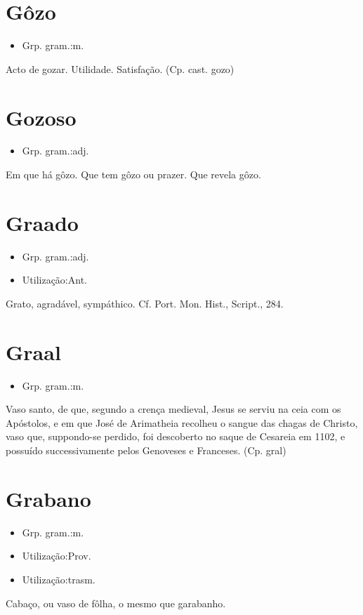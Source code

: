 \section{Gôzo}
\begin{itemize}
\item {Grp. gram.:m.}
\end{itemize}
Acto de gozar.
Utilidade.
Satisfação.
(Cp. cast. \textunderscore gozo\textunderscore )
\section{Gozoso}
\begin{itemize}
\item {Grp. gram.:adj.}
\end{itemize}
Em que há gôzo.
Que tem gôzo ou prazer.
Que revela gôzo.
\section{Graado}
\begin{itemize}
\item {Grp. gram.:adj.}
\end{itemize}
\begin{itemize}
\item {Utilização:Ant.}
\end{itemize}
Grato, agradável, sympáthico. Cf. \textunderscore Port. Mon. Hist.\textunderscore , \textunderscore Script.\textunderscore , 284.
\section{Graal}
\begin{itemize}
\item {Grp. gram.:m.}
\end{itemize}
Vaso santo, de que, segundo a crença medieval, Jesus se serviu na ceia com os Apóstolos, e em que José de Arimatheia recolheu o sangue das chagas de Christo, vaso que, suppondo-se perdido, foi descoberto no saque de Cesareia em 1102, e possuído successivamente pelos Genoveses e Franceses.
(Cp. \textunderscore gral\textunderscore )
\section{Grabano}
\begin{itemize}
\item {Grp. gram.:m.}
\end{itemize}
\begin{itemize}
\item {Utilização:Prov.}
\end{itemize}
\begin{itemize}
\item {Utilização:trasm.}
\end{itemize}
Cabaço, ou vaso de fôlha, o mesmo que \textunderscore garabanho\textunderscore .
